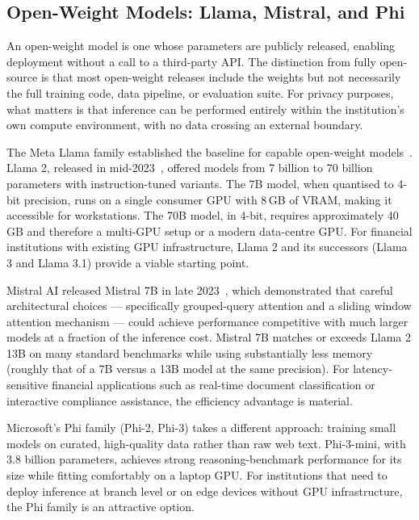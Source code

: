 \subsection{Open-Weight Models: Llama, Mistral, and Phi}
\label{sec:ch15-open-weight}

An open-weight model is one whose parameters are publicly released, enabling deployment without a call to a third-party API. The distinction from fully open-source is that most open-weight releases include the weights but not necessarily the full training code, data pipeline, or evaluation suite. For privacy purposes, what matters is that inference can be performed entirely within the institution's own compute environment, with no data crossing an external boundary.

The Meta Llama family established the baseline for capable open-weight models~\citep{touvron2023llama}. Llama 2, released in mid-2023~\citep{touvron2023llama2}, offered models from 7 billion to 70 billion parameters with instruction-tuned variants. The 7B model, when quantised to 4-bit precision, runs on a single consumer GPU with 8\,GB of VRAM, making it accessible for workstations. The 70B model, in 4-bit, requires approximately 40\,GB and therefore a multi-GPU setup or a modern data-centre GPU. For financial institutions with existing GPU infrastructure, Llama 2 and its successors (Llama 3 and Llama 3.1) provide a viable starting point.

Mistral AI released Mistral 7B in late 2023~\citep{jiang2023mistral}, which demonstrated that careful architectural choices — specifically grouped-query attention and a sliding window attention mechanism — could achieve performance competitive with much larger models at a fraction of the inference cost. Mistral 7B matches or exceeds Llama 2 13B on many standard benchmarks while using substantially less memory (roughly that of a 7B versus a 13B model at the same precision). For latency-sensitive financial applications such as real-time document classification or interactive compliance assistance, the efficiency advantage is material.

Microsoft's Phi family (Phi-2, Phi-3) takes a different approach: training small models on curated, high-quality data rather than raw web text. Phi-3-mini, with 3.8 billion parameters, achieves strong reasoning-benchmark performance for its size while fitting comfortably on a laptop GPU. For institutions that need to deploy inference at branch level or on edge devices without GPU infrastructure, the Phi family is an attractive option.

